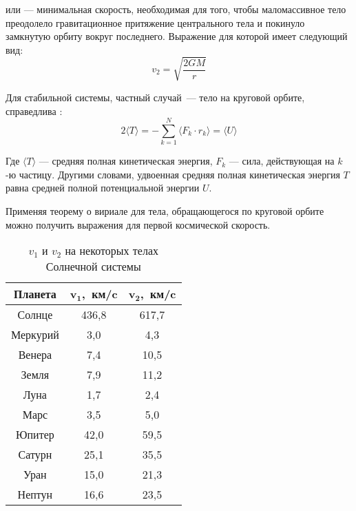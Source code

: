  или  --- 
минимальная скорость, необходимая для того, чтобы маломассивное тело преодолело 
гравитационное притяжение центрального тела и покинуло замкнутую орбиту вокруг 
последнего. Выражение для которой имеет следующий вид:\begin{equation}
v_{2}=\sqrt{\frac{2GM}{r}}
\end{equation}

Для стабильной системы, частный случай~--- тело на круговой орбите, справедлива 
:
\begin{equation}
2 \langle T\rangle 
= -\sum _{{k=1}}^{N}\langle {F}_{k}\cdot {r}_{k}\rangle 
= \langle U \rangle
\end{equation}

Где $\langle T\rangle$ --- средняя полная кинетическая энергия, $F_k$ --- сила, 
действующая на $k$-ю частицу. Другими словами, удвоенная средняя полная 
кинетическая энергия $T$ равна средней полной потенциальной энергии $U$. 

Применяя теорему о вириале для тела, обращающегося по круговой орбите можно 
получить выражения для первой космической скорость.

\begin{table}[h!]
\centering
\begin{tabular}{|c|c|c|}
\hline
\textbf{Планета} & $\mathbf{v_1}$,~\textbf{км/c} & 
$\mathbf{v_2}$,~\textbf{км/c}\\
\hline
Солнце & 436,8 & 617,7\\
\hline
Меркурий & 3,0 & 4,3\\
\hline
Венера & 7,4 & 10,5\\
\hline
Земля & 7,9 & 11,2\\
\hline
Луна & 1,7 & 2,4\\
\hline
Марс & 3,5 & 5,0\\
\hline
Юпитер & 42,0 & 59,5\\
\hline
Сатурн & 25,1 & 35,5\\
\hline
Уран & 15,0 & 21,3\\
\hline
Нептун & 16,6 & 23,5\\
\hline
\end{tabular}
\caption{$v_1$ и $v_2$ на некоторых телах Солнечной системы}
\end{table}




